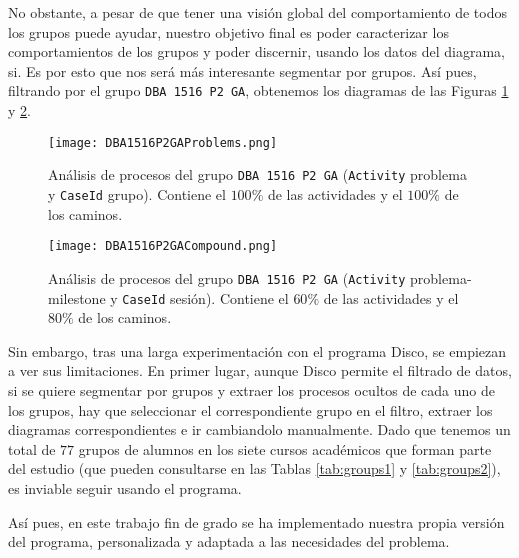 No obstante, a pesar de que tener una visión global del comportamiento de todos los grupos puede ayudar, nuestro objetivo final es poder caracterizar los comportamientos de los grupos y poder discernir, usando los datos del diagrama, si. Es por esto que nos será más interesante segmentar por grupos. Así pues, filtrando por el grupo \texttt{DBA 1516 P2 GA}, obtenemos los diagramas de las Figuras \ref{fig:problemsDBA1516P2GA} y \ref{fig:compoundDBA1516P2GA}.

\begin{figure}[H]
    \centering
    \texttt{[image: DBA1516P2GAProblems.png]}
    \caption{Análisis de procesos del grupo \texttt{DBA 1516 P2 GA} (\texttt{Activity} problema y \texttt{CaseId} grupo). Contiene el $100\%$ de las actividades y el $100\%$ de los caminos.}
    \label{fig:problemsDBA1516P2GA}
\end{figure}

\begin{figure}[H]
    \centering
    \texttt{[image: DBA1516P2GACompound.png]}
    \caption{Análisis de procesos del grupo \texttt{DBA 1516 P2 GA} (\texttt{Activity} problema-milestone y \texttt{CaseId} sesión). Contiene el $60\%$ de las actividades y el $80\%$ de los caminos.}
    \label{fig:compoundDBA1516P2GA}
\end{figure}

Sin embargo, tras una larga experimentación con el programa Disco, se empiezan a ver sus limitaciones. En primer lugar, aunque Disco permite el filtrado de datos, si se quiere segmentar por grupos y extraer los procesos ocultos de cada uno de los grupos, hay que seleccionar el correspondiente grupo en el filtro, extraer los diagramas correspondientes e ir cambiandolo manualmente. Dado que tenemos un total de $77$ grupos de alumnos en los siete cursos académicos que forman parte del estudio (que pueden consultarse en las Tablas \ref{tab:groups1} y \ref{tab:groups2}), es inviable seguir usando el programa.

Así pues, en este trabajo fin de grado se ha implementado nuestra propia versión del programa, personalizada y adaptada a las necesidades del problema.